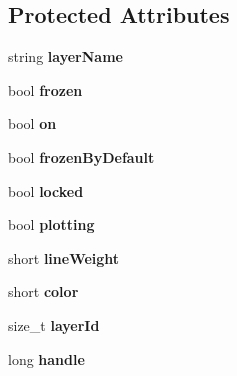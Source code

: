 \subsection*{Protected Attributes}
\begin{DoxyCompactItemize}
\item 
string {\bfseries layer\+Name}\hypertarget{class_c_a_d_layer_a1ca037d0494ca5bf871575645b19bc7f}{}\label{class_c_a_d_layer_a1ca037d0494ca5bf871575645b19bc7f}

\item 
bool {\bfseries frozen}\hypertarget{class_c_a_d_layer_a4be76412201399c311eb3842dee5b99e}{}\label{class_c_a_d_layer_a4be76412201399c311eb3842dee5b99e}

\item 
bool {\bfseries on}\hypertarget{class_c_a_d_layer_a811dd75742f5a84f666236a17903b97e}{}\label{class_c_a_d_layer_a811dd75742f5a84f666236a17903b97e}

\item 
bool {\bfseries frozen\+By\+Default}\hypertarget{class_c_a_d_layer_ad513c9301590ed4f12d64094f1213368}{}\label{class_c_a_d_layer_ad513c9301590ed4f12d64094f1213368}

\item 
bool {\bfseries locked}\hypertarget{class_c_a_d_layer_a222a521d790ff5a0cfa9c22cd6b775ae}{}\label{class_c_a_d_layer_a222a521d790ff5a0cfa9c22cd6b775ae}

\item 
bool {\bfseries plotting}\hypertarget{class_c_a_d_layer_afcf6ee15dcb0fa5c99d755dea4916e24}{}\label{class_c_a_d_layer_afcf6ee15dcb0fa5c99d755dea4916e24}

\item 
short {\bfseries line\+Weight}\hypertarget{class_c_a_d_layer_aa45be9da6742e65150cbc6c823a708f9}{}\label{class_c_a_d_layer_aa45be9da6742e65150cbc6c823a708f9}

\item 
short {\bfseries color}\hypertarget{class_c_a_d_layer_a2447a3bfaf004a45103b71074f30c6d4}{}\label{class_c_a_d_layer_a2447a3bfaf004a45103b71074f30c6d4}

\item 
size\+\_\+t {\bfseries layer\+Id}\hypertarget{class_c_a_d_layer_a1b6ed63d44cc22ff579e5b8e91d45438}{}\label{class_c_a_d_layer_a1b6ed63d44cc22ff579e5b8e91d45438}

\item 
long {\bfseries handle}\hypertarget{class_c_a_d_layer_a98aaf47433d4a761d50cb969f414a25e}{}\label{class_c_a_d_layer_a98aaf47433d4a761d50cb969f414a25e}


\end{DoxyCompactItemize}
